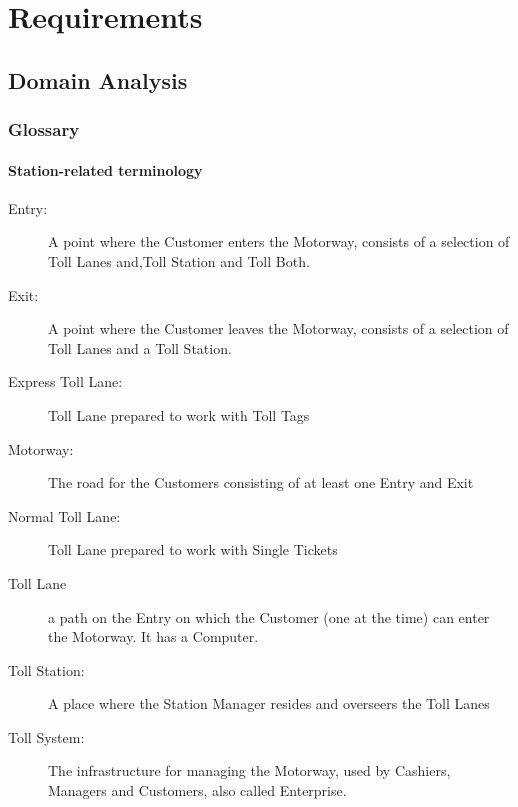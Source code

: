 \chapter{Requirements}
\noindent

\section{Domain Analysis}
\subsection{Glossary}
\subsubsection{Station-related terminology}
\begin{description}

  \item[Entry:] A point where the Customer enters the Motorway, consists of a selection of Toll Lanes and,Toll Station and Toll Both.
  \item[Exit:] A point where the Customer leaves the Motorway, consists of a selection of Toll Lanes and a Toll Station.
  \item[Express Toll Lane:] Toll Lane prepared to work with Toll Tags
  \item[Motorway:] The road for the Customers consisting of at least one Entry and Exit
  \item[Normal Toll Lane:] Toll Lane prepared to work with Single Tickets
  \item[Toll Lane] a path on the Entry on which the Customer (one at the time) can enter the Motorway. It has a Computer.
  \item[Toll Station:] A place where the Station Manager resides and overseers the Toll Lanes
  \item[Toll System:] The infrastructure for managing the Motorway, used by Cashiers, Managers and Customers, also called Enterprise.


\end{description}

